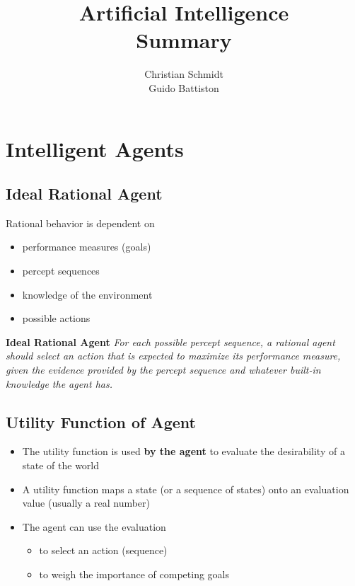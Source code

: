 \documentclass[conference, a4paper]{styles/acmsiggraph}
\title{\huge Artificial Intelligence \\ \LARGE {Summary}}
\author{\Large Christian Schmidt \\ \Small Guido Battiston}
\begin{document}
\maketitle

\tableofcontents
\newpage

\section{Intelligent Agents}

    \subsection{Ideal Rational Agent}
        Rational behavior is dependent on
        \begin{itemize}
            \item performance measures (goals)
            \item percept sequences
            \item knowledge of the environment
            \item possible actions
        \end{itemize}
        
        \textbf{Ideal Rational Agent}
        \textit{
            For each possible percept sequence, a rational agent should select an action that is expected to maximize its performance measure, given the evidence provided by the percept sequence and whatever built-in knowledge the agent has.
        }
        
        
    \subsection{Utility Function of Agent}
        \begin{itemize}
            \item The utility function is used \textbf{by the agent} to evaluate the desirability of a state of the world
            \item A utility function maps a state (or a sequence of states) onto an evaluation value (usually a real number)
            \item The agent can use the evaluation
                \begin{itemize}
                    \item to select an action (sequence)
                    \item to weigh the importance of competing goals
                \end{itemize}
        \end{itemize}
\end{document}
